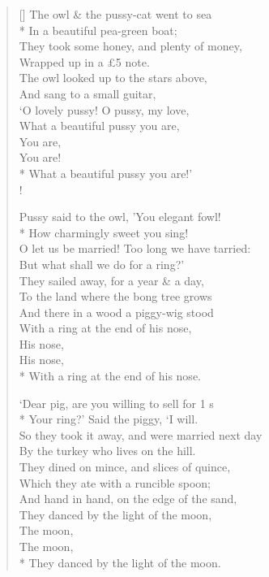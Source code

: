 \documentclass[MAIN]{subfiles}
\begin{document}
\settowidth{\versewidth}{The owl \& the pussy-cat went to sea}
\begin{verse}[\versewidth]
The owl \& the pussy-cat went to sea\\*
\vin In a beautiful pea-green boat;\\
They took some honey, and plenty of money,\\
\vin Wrapped up in a \pounds 5 note.\\
The owl looked up to the stars above,\\
\vin And sang to a small guitar,\\
`O lovely pussy! O pussy, my love,\\
\vin What a beautiful pussy you are,\\
\vin \vin You are,\\
\vin \vin You are!\\*
\vin What a beautiful pussy you are!'\\!

Pussy said to the owl, 'You elegant fowl!\\*
\vin How charmingly sweet you sing!\\
O let us be married! Too long we have tarried:\\
\vin But what shall we do for a ring?'\\
They sailed away, for a year \& a day,\\
\vin To the land where the bong tree grows\\
And there in a wood a piggy-wig stood\\
\vin With a ring at the end of his nose,\\
\vin \vin His nose,\\
\vin \vin His nose,\\*
\vin With a ring at the end of his nose.

`Dear pig, are you willing to sell for 1 s\\*
\vin Your ring?' Said the piggy, `I will.\\
So they took it away, and were married next day\\
\vin By the turkey who lives on the hill.\\
They dined on mince, and slices of quince,\\
\vin Which they ate with a runcible spoon;\\
And hand in hand, on the edge of the sand,\\
\vin They danced by the light of the moon,\\
\vin \vin The moon,\\
\vin \vin The moon,\\*
\vin They danced by the light of the moon.
\end{verse}
\end{document}
